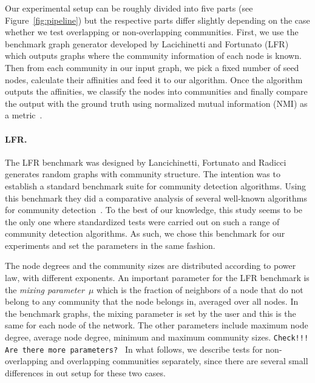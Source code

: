 Our experimental setup can be roughly divided into five parts (see Figure~\ref{fig:pipeline}) but the 
respective parts differ slightly depending on the case whether we test overlapping or non-overlapping 
communities. First, we use the benchmark graph generator developed by Lacichinetti and Fortunato 
(LFR)~\cite{LFR08, LF09} which outputs graphs where the community information of each node 
is known. Then from each community in our input graph, we pick a fixed number of seed nodes, 
calculate their affinities and feed it to our algorithm. Once the algorithm outputs the 
affinities, we classify the nodes into communities and finally compare the output 
with the ground truth using normalized mutual information (NMI) as a metric~\cite{DDDA05}.


\paragraph{LFR.}
The LFR benchmark was designed by Lancichinetti, Fortunato and Radicci~\cite{LFR08}
generates random graphs with community structure. The intention was to establish a 
standard benchmark suite for community detection algorithms. Using this benchmark they 
did a comparative analysis of several well-known algorithms
for community detection~\cite{LF09}. To the best of our knowledge, this study seems to be the 
only one where standardized tests were carried out on such a range of community detection algorithms. 
As such, we chose this benchmark for our experiments and set the parameters in the same fashion. 

The node degrees and the community sizes are distributed according to power law, with 
different exponents. An important parameter for the LFR benchmark is the 
\emph{mixing parameter~$\mu$} which is the fraction of neighbors 
of a node that do not belong to any community that the node belongs in, averaged over all nodes.
In the benchmark graphs, the mixing parameter is set by the user and this is the same for each 
node of the network. The other parameters include maximum node degree, average node degree, 
minimum and maximum community sizes. 
\texttt{Check!!! Are there more parameters? }
In what follows, we describe tests for non-overlapping and overlapping communities separately, since 
there are several small differences in out setup for these two cases. 

